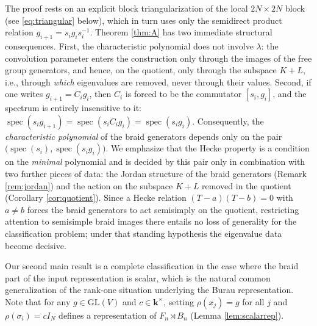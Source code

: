 \documentclass[11pt]{article}
\theoremstyle{definition}
\theoremstyle{remark}
\newcommand{\GL}{\mathrm{GL}}
\newcommand{\spec}{\operatorname{spec}}
\newcommand{\kk}{\boldsymbol{k}}
\begin{document}
The proof rests on an explicit block triangularization of the local
$2N \times 2N$ block (see \eqref{eq:triangular} below), which in turn
uses only the semidirect product relation
$g_{i+1} = s_i g_i s_i^{-1}$. Theorem \ref{thm:A} has two immediate
structural consequences. First, the characteristic polynomial does not
involve $\lambda$: the convolution parameter enters the construction only
through the images of the free group generators, and hence, on the quotient,
only through the subspace $K + L$, i.e., through \emph{which} eigenvalues
are removed, never through their values. Second, if one writes
$g_{i+1} = C_i g_i$, then $C_i$ is forced to be the commutator
$[s_i, g_i]$, and the spectrum is entirely insensitive to it:
$\spec(s_i g_{i+1}) = \spec(s_i C_i g_i) = \spec(s_i g_i)$. Consequently, the \emph{characteristic polynomial} of the braid
generators depends only on the pair
$\bigl(\spec(s_i), \spec(s_i g_i)\bigr)$. We emphasize that the Hecke
property is a condition on the \emph{minimal} polynomial and is decided
by this pair only in combination with two further pieces of data: the
Jordan structure of the braid generators (Remark \ref{rem:jordan}) and
the action on the subspace $K + L$ removed in the quotient (Corollary
\ref{cor:quotient}). Since a Hecke relation $(T - a)(T - b) = 0$ with
$a \neq b$ forces the braid generators to act semisimply on the quotient,
restricting attention to semisimple braid images there entails no loss
of generality for the classification problem; under that standing hypothesis the eigenvalue
data become decisive.

Our second main result is a complete classification in the case where the
braid part of the input representation is scalar, which is the natural
common generalization of the rank-one situation underlying the Burau
representation. Note that for any $g \in \GL(V)$ and $c \in \kk^{\times}$,
setting $\rho(x_j) = g$ for all $j$ and $\rho(\sigma_i) = cI_N$ defines a
representation of $F_n \rtimes B_n$ (Lemma \ref{lem:scalarrep}).
\end{document}
